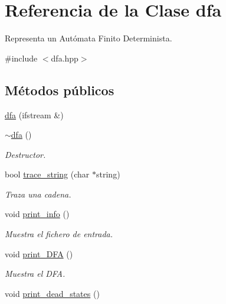 \hypertarget{classdfa}{}\section{Referencia de la Clase dfa}
\label{classdfa}


Representa un Autómata Finito Determinista.  




{\ttfamily \#include $<$dfa.\+hpp$>$}

\subsection*{Métodos públicos}
\begin{DoxyCompactItemize}
\item 
\hyperlink{classdfa_a7b75496b449bb8519abf14d1507322b1}{dfa} (ifstream \&)
\item 
\hypertarget{classdfa_a0886b3b3873afc65717520f896fe21a4}{}\hyperlink{classdfa_a0886b3b3873afc65717520f896fe21a4}{$\sim$dfa} ()\label{classdfa_a0886b3b3873afc65717520f896fe21a4}

\begin{DoxyCompactList}\small\item\em Destructor. \end{DoxyCompactList}\item 
bool \hyperlink{classdfa_a85e426c283ac1551d8aac804c01505ec}{trace\+\_\+string} (char $\ast$string)
\begin{DoxyCompactList}\small\item\em Traza una cadena. \end{DoxyCompactList}\item 
\hypertarget{classdfa_a4d32adecf0f1ebf96ef9e258278062aa}{}void \hyperlink{classdfa_a4d32adecf0f1ebf96ef9e258278062aa}{print\+\_\+info} ()\label{classdfa_a4d32adecf0f1ebf96ef9e258278062aa}

\begin{DoxyCompactList}\small\item\em Muestra el fichero de entrada. \end{DoxyCompactList}\item 
\hypertarget{classdfa_ac07d3b722dd79e569ba8ed8fba089e1b}{}void \hyperlink{classdfa_ac07d3b722dd79e569ba8ed8fba089e1b}{print\+\_\+\+D\+F\+A} ()\label{classdfa_ac07d3b722dd79e569ba8ed8fba089e1b}

\begin{DoxyCompactList}\small\item\em Muestra el D\+F\+A. \end{DoxyCompactList}\item 
\hypertarget{classdfa_abf8976cebf8bba5b843442ab3fd836f1}{}void \hyperlink{classdfa_abf8976cebf8bba5b843442ab3fd836f1}{print\+\_\+dead\+\_\+states} ()\label{classdfa_abf8976cebf8bba5b843442ab3fd836f1}


\end{DoxyCompactItemize}
